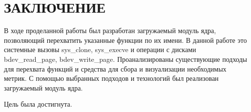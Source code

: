 \chapter*{ЗАКЛЮЧЕНИЕ}

В ходе проделанной работы был разработан загружаемый модуль ядра, позволяющий перехватить указанные функции по их имени. В данной работе это системные вызовы sys\_clone, sys\_execve и операции с дисками bdev\_read\_page, bdev\_write\_page. Проанализированы существующие подходы для перехвата функций и средства для сбора и визуализации необходимых метрик. С помощью выбранных подходов и технологий был реализован загружаемый модуль ядра.

Цель была достигнута.
